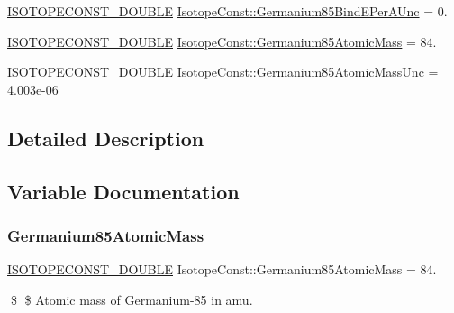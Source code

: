 \begin{DoxyCompactItemize}
\mbox{\hyperlink{group___isotope_const-_macros_ga8f45a7272ce02c0b4c65c44636ed719a}{I\+S\+O\+T\+O\+P\+E\+C\+O\+N\+S\+T\+\_\+\+D\+O\+U\+B\+LE}} \mbox{\hyperlink{group___isotope_const-_germanium-_ge85_gac27653b4b1fe98067e446925c8d26bb1}{Isotope\+Const\+::\+Germanium85\+Bind\+E\+Per\+A\+Unc}} = 0.
\item 
\mbox{\hyperlink{group___isotope_const-_macros_ga8f45a7272ce02c0b4c65c44636ed719a}{I\+S\+O\+T\+O\+P\+E\+C\+O\+N\+S\+T\+\_\+\+D\+O\+U\+B\+LE}} \mbox{\hyperlink{group___isotope_const-_germanium-_ge85_gaa993de38d45fede54c6a778a2cb6cf50}{Isotope\+Const\+::\+Germanium85\+Atomic\+Mass}} = 84.
\item 
\mbox{\hyperlink{group___isotope_const-_macros_ga8f45a7272ce02c0b4c65c44636ed719a}{I\+S\+O\+T\+O\+P\+E\+C\+O\+N\+S\+T\+\_\+\+D\+O\+U\+B\+LE}} \mbox{\hyperlink{group___isotope_const-_germanium-_ge85_gab6711e2b33fb4c525ad1214b5f5f8beb}{Isotope\+Const\+::\+Germanium85\+Atomic\+Mass\+Unc}} = 4.\+003e-\/06
\end{DoxyCompactItemize}


\subsection{Detailed Description}


\subsection{Variable Documentation}
\mbox{\label{group___isotope_const-_germanium-_ge85_gaa993de38d45fede54c6a778a2cb6cf50}} 
\subsubsection{\texorpdfstring{Germanium85\+Atomic\+Mass}{Germanium85AtomicMass}}
{\footnotesize\ttfamily \mbox{\hyperlink{group___isotope_const-_macros_ga8f45a7272ce02c0b4c65c44636ed719a}{I\+S\+O\+T\+O\+P\+E\+C\+O\+N\+S\+T\+\_\+\+D\+O\+U\+B\+LE}} Isotope\+Const\+::\+Germanium85\+Atomic\+Mass = 84.}

\$ \$ Atomic mass of Germanium-\/85 in amu. \mbox{\label{group___isotope_const-_germanium-_ge85_gab6711e2b33fb4c525ad1214b5f5f8beb}} 
